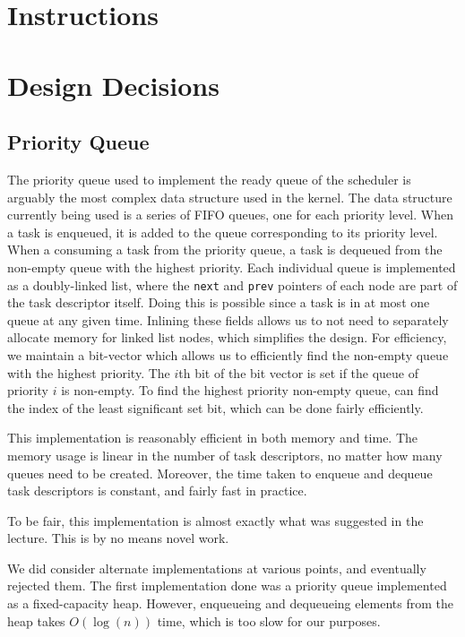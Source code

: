 \documentclass{article}
\begin{document}
\section{Instructions}

\section{Design Decisions}
\subsection{Priority Queue}
The priority queue used to implement the ready queue of the scheduler is
arguably the most complex data structure used in the kernel.
The data structure currently being used is a series of FIFO queues, one for
each priority level.
When a task is enqueued, it is added to the queue corresponding to its priority
level.
When a consuming a task from the priority queue, a task is dequeued from the
non-empty queue with the highest priority.
Each individual queue is implemented as a doubly-linked list, where the
\texttt{next} and \texttt{prev} pointers of each node are part of the task
descriptor itself.
Doing this is possible since a task is in at most one queue at any given time.
Inlining these fields allows us to not need to separately allocate memory for
linked list nodes, which simplifies the design.
For efficiency, we maintain a bit-vector which allows us to efficiently find
the non-empty queue with the highest priority.
The $i$th bit of the bit vector is set if the queue of priority $i$ is non-empty.
To find the highest priority non-empty queue, can find the index of the least
significant set bit, which can be done fairly efficiently.

This implementation is reasonably efficient in both memory and time.
The memory usage is linear in the number of task descriptors, no matter
how many queues need to be created.
Moreover, the time taken to enqueue and dequeue task descriptors is constant,
and fairly fast in practice.

To be fair, this implementation is almost exactly what was suggested in the lecture.
This is by no means novel work.

We did consider alternate implementations at various points, and eventually rejected them.
The first implementation done was a priority queue implemented as a fixed-capacity heap.
However, enqueueing and dequeueing elements from the heap takes $O(\log(n))$ time,
which is too slow for our purposes.
\end{document}
